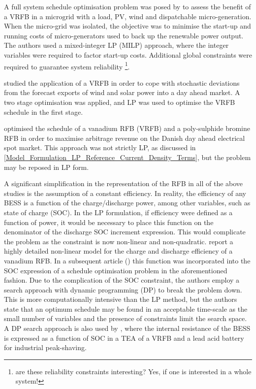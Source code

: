 \documentclass[preprint,3p,review,authoryear,10pt]{elsarticle}
\newcommand{\sol}[1]{\footnote{#1}\marginpar{\fbox{\thefootnote}}}
\begin{document}
A full system schedule optimisation problem was posed by \cite{Chen2012} to assess the benefit of a VRFB in a microgrid with a load, PV, wind and dispatchable micro-generation. When the micro-grid was isolated, the objective was to minimise the start-up and running costs of micro-generators used to back up the renewable power output. The authors used a mixed-integer LP (MILP) approach, where the integer variables were required to factor start-up costs. Additional global constraints were required to guarantee system reliability \sol{are these reliability constraints interesting? Yes, if one is interested in a whole system!}.

\cite{Gomes2017}  studied the application of a VRFB in order to cope with stochastic deviations from the forecast exports of wind and solar power into a day ahead market. A two stage optimisation was applied, and LP was used to optimise the VRFB schedule in the first stage.

\cite{Hu2010} optimised the schedule of a vanadium RFB (VRFB) and a poly-sulphide bromine RFB in order to maximise arbitrage revenue on the Danish day ahead electrical spot market. This approach was not strictly LP, as discussed in \cref{Model_Formulation_LP_Reference_Current_Density_Terms}, but the problem may be reposed in LP form.



A significant simplification in the representation of the RFB in all of the above studies is the assumption of a constant efficiency. In reality, the efficiency of any BESS is a function of the charge/discharge power, among other variables, such as state of charge (SOC). In the LP formulation, if efficiency were defined as a  function of power, it would be necessary to place this function on the denominator of the  discharge SOC increment expression. This would complicate the problem as the constraint is now non-linear and non-quadratic. \cite{Nguyen2014} report a highly detailed non-linear model for the charge and discharge efficiency of a vanadium RFB. In a subsequent article (\cite{Nguyen2015}) this function was incorporated into the SOC expression of a schedule optimisation problem in the aforementioned fashion. Due to the complication of the SOC constraint, the authors employ a search approach with dynamic programming (DP) to break the problem down. This is more computationally intensive than the LP method, but the authors state that an optimum schedule may be found in an acceptable time-scale as the small number of variables and the presence of constraints limit the search space.
A DP search approach is also used by \cite{Oudalov2007}, where the internal resistance of the BESS is expressed as a function of SOC in a TEA of a VRFB and a lead acid battery for industrial peak-shaving.
\end{document}

